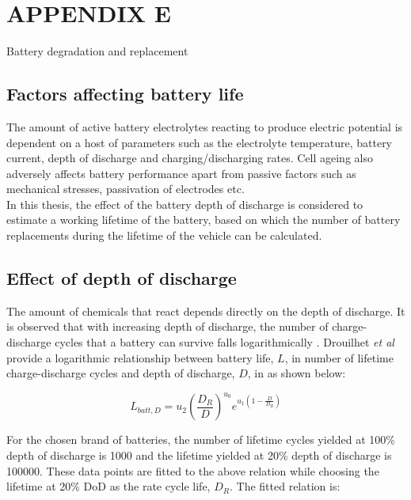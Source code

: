 \documentclass[ExampleMasters.tex]{subfiles}
\begin{document}
	\chapter{APPENDIX E}
	{\Large Battery degradation and replacement}

	\section{Factors affecting battery life}
		The amount of active battery electrolytes reacting to produce electric potential is dependent on a host of parameters such as the electrolyte temperature, battery current, depth of discharge and charging/discharging rates. Cell ageing also adversely affects battery performance apart from passive factors such as mechanical stresses, passivation of electrodes etc.\\

		In this thesis, the effect of the battery depth of discharge is considered to estimate a working lifetime of the battery, based on which the number of battery replacements during the lifetime of the vehicle can be calculated.\\

	\section{Effect of depth of discharge}
		The amount of chemicals that react depends directly on the depth of discharge. It is observed that with increasing depth of discharge, the number of charge-discharge cycles that a battery can survive falls logarithmically \cite{BatteryLife}. Drouilhet \textit{et al} provide a logarithmic relationship between battery life, $L$, in number of lifetime charge-discharge cycles and depth of discharge, $D$, in \cite{BatteryLifeDoDRelation} as shown below:

		\begin{equation}
			L_{batt, D} = u_2 \left(\frac{D_R}{D}\right)^{u_0} e^{u_1\left(1-\frac{D}{D_R}\right)}
		\end{equation}


		For the chosen brand of batteries, the number of lifetime cycles yielded at 100\% depth of discharge is 1000 and the lifetime yielded at 20\% depth of discharge is 100000. These data points are fitted to the above relation while choosing the lifetime at 20\% DoD as the rate cycle life, $D_R$. The fitted relation is:
\end{document}
